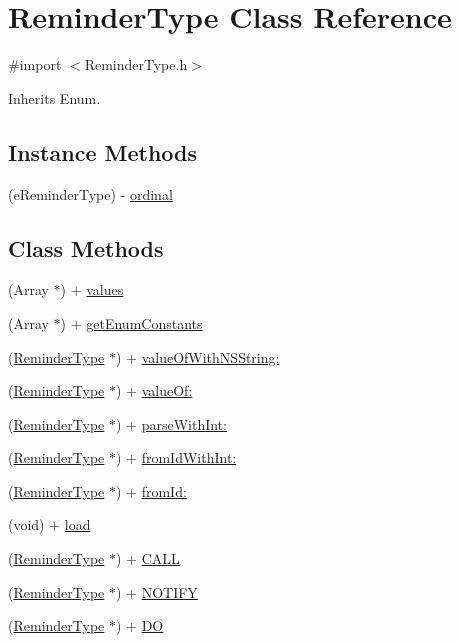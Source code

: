 \hypertarget{interface_reminder_type}{}\section{Reminder\+Type Class Reference}
\label{interface_reminder_type}


{\ttfamily \#import $<$Reminder\+Type.\+h$>$}



Inherits Enum.

\subsection*{Instance Methods}
\begin{DoxyCompactItemize}
\item 
(e\+Reminder\+Type) -\/ \hyperlink{interface_reminder_type_a9be9316e479d24db05dfa427efdedca2}{ordinal}
\end{DoxyCompactItemize}
\subsection*{Class Methods}
\begin{DoxyCompactItemize}
\item 
(Array $\ast$) + \hyperlink{interface_reminder_type_a19970999dce04d6a633ea40a04a6e4f6}{values}
\item 
(Array $\ast$) + \hyperlink{interface_reminder_type_a1e83597740122d043f183f8b4d8eff0f}{get\+Enum\+Constants}
\item 
(\hyperlink{interface_reminder_type}{Reminder\+Type} $\ast$) + \hyperlink{interface_reminder_type_a156b2d3e22fc16ffe93c4c7f37d3ebc0}{value\+Of\+With\+N\+S\+String\+:}
\item 
(\hyperlink{interface_reminder_type}{Reminder\+Type} $\ast$) + \hyperlink{interface_reminder_type_a3e2065473ec0f208d0a6eed39cecbfb3}{value\+Of\+:}
\item 
(\hyperlink{interface_reminder_type}{Reminder\+Type} $\ast$) + \hyperlink{interface_reminder_type_afe4dd2adb337d24717095273416bde9b}{parse\+With\+Int\+:}
\item 
(\hyperlink{interface_reminder_type}{Reminder\+Type} $\ast$) + \hyperlink{interface_reminder_type_ab6dedc418567bd316e90aba39420b255}{from\+Id\+With\+Int\+:}
\item 
(\hyperlink{interface_reminder_type}{Reminder\+Type} $\ast$) + \hyperlink{interface_reminder_type_a1eebc70d6e346f590228bbe7a3462f23}{from\+Id\+:}
\item 
(void) + \hyperlink{interface_reminder_type_a1ab5123cdf52687c9255b3a0dcb87cc3}{load}
\item 
(\hyperlink{interface_reminder_type}{Reminder\+Type} $\ast$) + \hyperlink{interface_reminder_type_a4e429298799342d7c7114880e645d073}{C\+A\+L\+L}
\item 
(\hyperlink{interface_reminder_type}{Reminder\+Type} $\ast$) + \hyperlink{interface_reminder_type_abb04f7b2c8b0be93d21bc77ade83c0fc}{N\+O\+T\+I\+F\+Y}
\item 
(\hyperlink{interface_reminder_type}{Reminder\+Type} $\ast$) + \hyperlink{interface_reminder_type_a0c8d007a3b46883b983facbd27ea9d99}{D\+O}
\end{DoxyCompactItemize}


